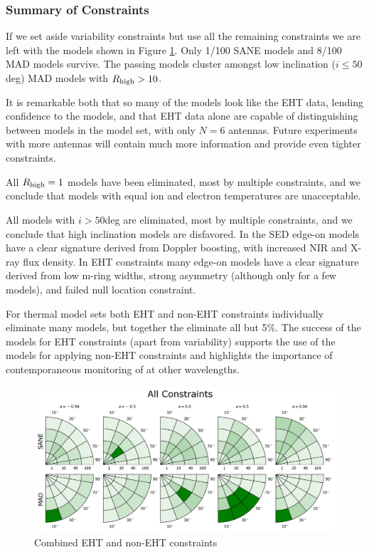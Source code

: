 \subsubsection{Summary of Constraints}

If we set aside variability constraints but use all the remaining constraints we are left with the models shown in Figure \ref{fig:all_cuts}.  Only 1/100 SANE models and 8/100 MAD models survive. The passing models cluster amongst low inclination ($i \le 50$deg) MAD models with $R_\mathrm{high} > 10$.

It is remarkable both that so many of the models look like the EHT data, lending confidence to the models, and that EHT data alone are capable of distinguishing between models in the model set, with only $N = 6$ antennas.  Future experiments with more antennas will contain much more information and provide even tighter constraints.

All $R_\mathrm{high} = 1$ models have been eliminated, most by multiple constraints, and we conclude that models with equal ion and electron temperatures are unacceptable.

All models with $i > 50$deg are eliminated, most by multiple constraints, and we conclude that high inclination models are disfavored.  In the SED edge-on models have a clear signature derived from Doppler boosting, with increased NIR and X-ray flux density.  In EHT constraints many edge-on models have a clear signature derived from low m-ring widths, strong asymmetry (although only for a few models), and failed null location constraint.

For thermal model sets both EHT and non-EHT constraints individually eliminate many models, but together the eliminate all but 5\%.  The success of the models for EHT constraints (apart from variability) supports the use of the models for applying non-EHT constraints and highlights the importance of contemporaneous monitoring of \sgra at other wavelengths.

\begin{figure}
  \centering
  \includegraphics[width=\columnwidth]{./figures/All_Constraints.png}
  \caption{Combined EHT and non-EHT constraints}
  \label{fig:all_cuts}
\end{figure}

